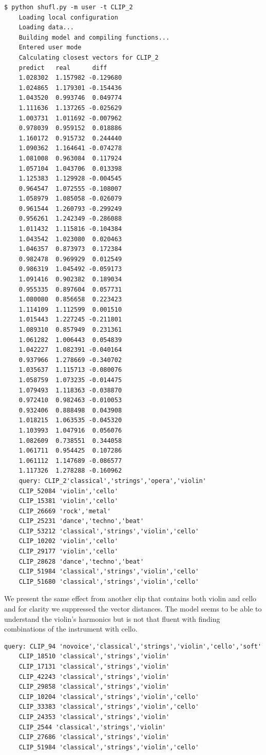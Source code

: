 \documentclass[11pt, a4paper]{article}
\begin{document}
    \begin{Verbatim}[xleftmargin=.5in]
    $ python shufl.py -m user -t CLIP_2
    Loading local configuration
    Loading data...
    Building model and compiling functions...
    Entered user mode
    Calculating closest vectors for CLIP_2
    predict   real      diff
    1.028302  1.157982 -0.129680
    1.024865  1.179301 -0.154436
    1.043520  0.993746  0.049774
    1.111636  1.137265 -0.025629
    1.003731  1.011692 -0.007962
    0.978039  0.959152  0.018886
    1.160172  0.915732  0.244440
    1.090362  1.164641 -0.074278
    1.081008  0.963084  0.117924
    1.057104  1.043706  0.013398
    1.125383  1.129928 -0.004545
    0.964547  1.072555 -0.108007
    1.058979  1.085058 -0.026079
    0.961544  1.260793 -0.299249
    0.956261  1.242349 -0.286088
    1.011432  1.115816 -0.104384
    1.043542  1.023080  0.020463
    1.046357  0.873973  0.172384
    0.982478  0.969929  0.012549
    0.986319  1.045492 -0.059173
    1.091416  0.902382  0.189034
    0.955335  0.897604  0.057731
    1.080080  0.856658  0.223423
    1.114109  1.112599  0.001510
    1.015443  1.227245 -0.211801
    1.089310  0.857949  0.231361
    1.061282  1.006443  0.054839
    1.042227  1.082391 -0.040164
    0.937966  1.278669 -0.340702
    1.035637  1.115713 -0.080076
    1.058759  1.073235 -0.014475
    1.079493  1.118363 -0.038870
    0.972410  0.982463 -0.010053
    0.932406  0.888498  0.043908
    1.018215  1.063535 -0.045320
    1.103993  1.047916  0.056076
    1.082609  0.738551  0.344058
    1.061711  0.954425  0.107286
    1.061112  1.147689 -0.086577
    1.117326  1.278288 -0.160962
    query: CLIP_2'classical','strings','opera','violin'
    CLIP_52084 'violin','cello'
    CLIP_15381 'violin','cello'
    CLIP_26669 'rock','metal'
    CLIP_25231 'dance','techno','beat'
    CLIP_53212 'classical','strings','violin','cello'
    CLIP_10202 'violin','cello'
    CLIP_29177 'violin','cello'
    CLIP_28628 'dance','techno','beat'
    CLIP_51984 'classical','strings','violin','cello'
    CLIP_51680 'classical','strings','violin','cello'
    \end{Verbatim}

    \noindent
    We present the same effect from another clip that contains both violin and
    cello and for clarity we suppressed the vector distances. The model seems to
    be able to understand the violin's harmonics but is not that fluent with
    finding combinations of the instrument with cello.

    \begin{Verbatim}[xleftmargin=.5in]
    query: CLIP_94 'novoice','classical','strings','violin','cello','soft'
    CLIP_18510 'classical','strings','violin'
    CLIP_17131 'classical','strings','violin'
    CLIP_42243 'classical','strings','violin'
    CLIP_29858 'classical','strings','violin'
    CLIP_10204 'classical','strings','violin','cello'
    CLIP_33383 'classical','strings','violin','cello'
    CLIP_24353 'classical','strings','violin'
    CLIP_2544 'classical','strings','violin'
    CLIP_27686 'classical','strings','violin'
    CLIP_51984 'classical','strings','violin','cello'
    \end{Verbatim}
\end{document}

